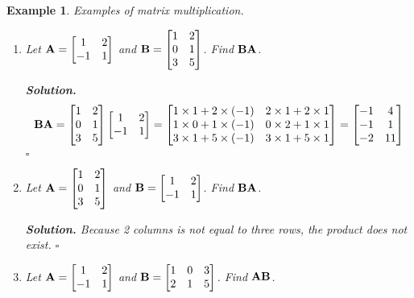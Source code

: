 \documentclass[12pt, a4paper]{article}
\newtheorem{eg}{Example}[subsection]
\newenvironment*{sol}{\par\indent\textbf{\textit{Solution. }}}{\hfill{$\square$}\par}
\def\matrixA{\vb{A}}
\def\matrixB{\vb{B}}
\begin{document}
\begin{eg}
Examples of matrix multiplication.
\begin{enumerate}
	\item Let $\matrixA=\begin{bmatrix}1&2\\-1&1\end{bmatrix}$ and $\matrixB=\begin{bmatrix}1&2\\0&1\\3&5\end{bmatrix}$. Find $\matrixB\matrixA$.\\
	\begin{sol}\[\matrixB\matrixA=\begin{bmatrix}1&2\\0&1\\3&5\end{bmatrix}\begin{bmatrix}1&2\\-1&1\end{bmatrix}=\begin{bmatrix}1\times1+2\times(-1)&2\times1+2\times1\\1\times0+1\times(-1)&0\times2+1\times1\\3\times1+5\times(-1)&3\times1+5\times1\end{bmatrix}=\begin{bmatrix}-1&4\\-1&1\\-2&11\end{bmatrix}\]\end{sol}
	\item Let $\matrixA=\begin{bmatrix}1&2\\0&1\\3&5\end{bmatrix}$ and $\matrixB=\begin{bmatrix}1&2\\-1&1\end{bmatrix}$. Find $\matrixB\matrixA$.\\
	\begin{sol} Because 2 columns is not equal to three rows, the product does not exist. \end{sol}
	\item Let $\matrixA=\begin{bmatrix}1&2\\-1&1\end{bmatrix}$ and $\matrixB=\begin{bmatrix}1&0&3\\2&1&5\end{bmatrix}$. Find $\matrixA\matrixB$.\\

\end{enumerate}
\end{eg}
\end{document}

